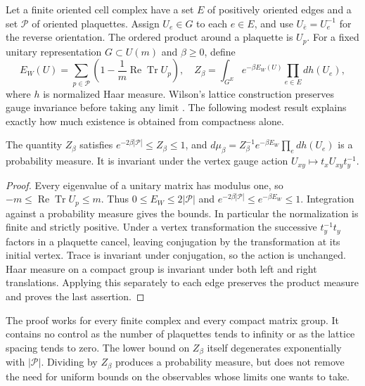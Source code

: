 Let a finite oriented cell complex have a set $E$ of positively oriented
edges and a set $\mathcal P$ of oriented plaquettes.  Assign $U_e\in G$ to
each $e\in E$, and use $U_{\bar e}=U_e^{-1}$ for the reverse orientation.
The ordered product around a plaquette is $U_p$.  For a fixed unitary
representation $G\subset U(m)$ and $\beta\geq0$, define
\begin{equation}
 E_W(U)=\sum_{p\in\mathcal P}
 \left(1-\frac1m\operatorname{Re}\operatorname{Tr}U_p\right),\quad
 Z_\beta=\int_{G^E}e^{-\beta E_W(U)}\prod_{e\in E}dh(U_e),
 \label{eq:wilson-finite}
\end{equation}
where $h$ is normalized Haar measure.  Wilson's lattice construction
preserves gauge invariance before taking any limit \cite{Wilson1974}.
The following modest result explains exactly how much existence is obtained
from compactness alone.

\begin{proposition}
The quantity $Z_\beta$ satisfies
$e^{-2\beta|\mathcal P|}\leq Z_\beta\leq1$, and
$d\mu_\beta=Z_\beta^{-1}e^{-\beta E_W}\prod_e dh(U_e)$ is a
probability measure.  It is invariant under the vertex gauge action
$U_{xy}\mapsto t_xU_{xy}t_y^{-1}$.
\end{proposition}

\begin{proof}
Every eigenvalue of a unitary matrix has modulus one, so
$-m\leq\operatorname{Re}\operatorname{Tr}U_p\leq m$.
Thus $0\leq E_W\leq2|\mathcal P|$ and
$e^{-2\beta|\mathcal P|}\leq e^{-\beta E_W}\leq1$.
Integration against a probability measure gives the bounds.  In particular
the normalization is finite and strictly positive.
Under a vertex transformation the successive $t_y^{-1}t_y$ factors in a
plaquette cancel, leaving conjugation by the transformation at its initial
vertex.  Trace is invariant under conjugation, so the action is unchanged.
Haar measure on a compact group is invariant under both left and right
translations.  Applying this separately to each edge preserves the product
measure and proves the last assertion.
\end{proof}

The proof works for every finite complex and every compact matrix group.
It contains no control as the number of plaquettes tends to infinity or as
the lattice spacing tends to zero.  The lower bound on $Z_\beta$ itself
degenerates exponentially with $|\mathcal P|$.  Dividing by $Z_\beta$
produces a probability measure, but does not remove the need for uniform
bounds on the observables whose limits one wants to take.

